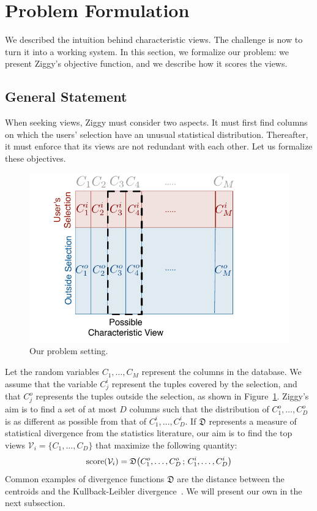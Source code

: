 \section{Problem Formulation}
\label{sec:algorithm}

We described the intuition behind characteristic views.  The challenge is now
to turn it into a working system. In this section, we formalize our problem: we
present Ziggy's objective function, and we describe how it scores the views.

\subsection{General Statement} 
When seeking views, Ziggy must consider two aspects. It must first find columns
on which the users' selection have an unusual statistical distribution.
Thereafter, it must enforce that its views are not redundant with each other.
Let us formalize these objectives.

\label{sec:problem}
\begin{figure}[t!]
    \centering
    \includegraphics[width=0.75\columnwidth]{Images/Setting}
    \caption{Our problem setting.}
    \label{fig:setting}
\end{figure}
Let the random variables $C_1, \ldots, C_M$ represent the columns in the
database.  We assume that the variable $C_j^i$ represent the tuples covered by
the selection, and that $C_j^o$ represents the tuples outside the selection, as
shown in Figure~\ref{fig:setting}.  Ziggy's aim is to find a set of at most $D$
columns such that the distribution of $C_1^o, \ldots, C_D^o$ is as different as
possible from that of $C_1^i, \ldots, C_D^i$. If $\mathfrak{D}$ represents a
measure of statistical divergence from the statistics literature, our aim is to
find the top views $\mathcal{V}_i = \{C_1, \ldots, C_D\}$ that maximize the
following quantity:
\begin{equation}
    \label{eq:objective0}
    \text{score} (\mathcal{V}_i) = \mathfrak{D}\big( C_1^o, \ldots, C_D^o \,;\, C_1^i, \ldots, C_D^i \big)\\
\end{equation}
Common examples of divergence functions $\mathfrak{D}$ are the distance between
the centroids and the Kullback-Leibler divergence~\cite{wasserman2013all}.  We
will present our own in the next subsection.

